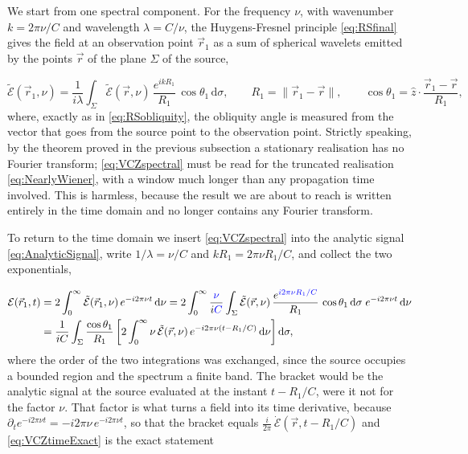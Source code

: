 		We start from one spectral component. For the frequency $\nu$, with wavenumber
		$k=2\pi\nu/C$ and wavelength $\lambda=C/\nu$, the Huygens-Fresnel principle
		\eqref{eq:RSfinal} gives the field at an observation point $\vec{r}_{1}$ as a sum of
		spherical wavelets emitted by the points $\vec{r}$ of the plane $\Sigma$ of the source,

		\begin{equation}\label{eq:VCZspectral}
			\tilde{\mathcal{E}}(\vec{r}_{1},\nu) = \frac{1}{i\lambda}\int_{\Sigma}\tilde{\mathcal{E}}(\vec{r},\nu)\,\frac{e^{ikR_{1}}}{R_{1}}\,\cos\theta_{1}\,\mathrm{d}\sigma,
			\qquad R_{1} = \|\vec{r}_{1}-\vec{r}\|, \qquad \cos\theta_{1} = \hat{z}\cdot\frac{\vec{r}_{1}-\vec{r}}{R_{1}},
		\end{equation}
		where, exactly as in \eqref{eq:RSobliquity}, the obliquity angle is measured from the
		vector that goes from the source point to the observation point. Strictly speaking, by
		the theorem proved in the previous subsection a stationary realisation has no Fourier
		transform; \eqref{eq:VCZspectral} must be read for the truncated realisation
		\eqref{eq:NearlyWiener}, with a window much longer than any propagation time involved.
		This is harmless, because the result we are about to reach is written entirely in the
		time domain and no longer contains any Fourier transform.

		To return to the time domain we insert \eqref{eq:VCZspectral} into the analytic signal
		\eqref{eq:AnalyticSignal}, write $1/\lambda=\nu/C$ and $kR_{1}=2\pi\nu R_{1}/C$, and
		collect the two exponentials,

		\begin{align}
			\mathcal{E}(\vec{r}_{1},t) &= 2\int_{0}^{\infty}\tilde{\mathcal{E}}(\vec{r}_{1},\nu)\,e^{-i2\pi\nu t}\,\mathrm{d}\nu
			= 2\int_{0}^{\infty}\frac{\textcolor{blue}{\nu}}{i\textcolor{blue}{C}}\int_{\Sigma}\tilde{\mathcal{E}}(\vec{r},\nu)\,\frac{e^{\textcolor{blue}{i2\pi\nu R_{1}/C}}}{R_{1}}\,\cos\theta_{1}\,\mathrm{d}\sigma\;e^{-i2\pi\nu t}\,\mathrm{d}\nu \nonumber\\
			&= \frac{1}{iC}\int_{\Sigma}\frac{\cos\theta_{1}}{R_{1}}\left[2\int_{0}^{\infty}\nu\,\tilde{\mathcal{E}}(\vec{r},\nu)\,e^{-i2\pi\nu\left(t-R_{1}/C\right)}\,\mathrm{d}\nu\right]\mathrm{d}\sigma , \label{eq:VCZtimeExact}
		\end{align}
		where the order of the two integrations was exchanged, since the source occupies a
		bounded region and the spectrum a finite band. The bracket would be the analytic signal
		at the source evaluated at the instant $t-R_{1}/C$, were it not for the factor $\nu$.
		That factor is what turns a field into its time derivative, because
		$\partial_{t}e^{-i2\pi\nu t}=-i2\pi\nu\,e^{-i2\pi\nu t}$, so that the bracket equals
		$\frac{i}{2\pi}\,\dot{\mathcal{E}}(\vec{r},t-R_{1}/C)$ and \eqref{eq:VCZtimeExact} is the
		exact statement

